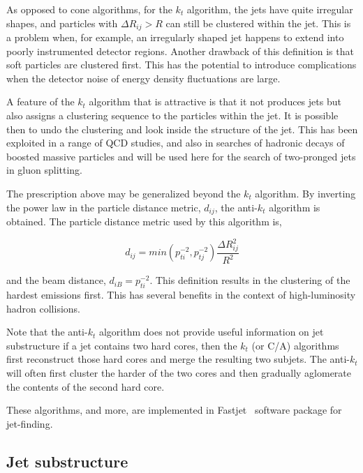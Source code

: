 As opposed to cone algorithms, for the $k_t$ algorithm, the jets have quite irregular shapes, and particles with $\Delta R_{ij} > R$ can still be clustered within the jet. This is a problem when, for example, an irregularly shaped jet happens to extend into poorly instrumented detector regions. Another drawback of this definition is that soft particles are clustered first. This  has the potential to introduce complications when the detector noise of energy density fluctuations are large.

A feature of the $k_t$ algorithm that is attractive is that it not produces jets but also assigns a clustering sequence to the particles within the jet. It is possible then to undo the clustering and look inside the structure of the jet. This has been exploited in a range of QCD studies, and also in searches of hadronic decays of boosted massive particles  and will be used here for the search of two-pronged jets in gluon splitting.

The prescription above may be generalized beyond the $k_t$ algorithm. By inverting the power law in the particle distance metric, $d_{ij}$, the anti-$k_t$ algorithm is obtained. The particle distance metric used by this algorithm is,

\begin{equation} 
d_{ij} = min(p^{-2}_{ti},p^{-2}_{tj}) \frac{\Delta R^2_{ij}}{R^2}
\label{eqn:antikt}
\end{equation}

and the  beam distance, $d_{iB}=p^{-2}_{ti}$. This definition results in the clustering of the hardest emissions first. This has several benefits in the context of high-luminosity hadron collisions.

Note that the anti-$k_t$ algorithm does not provide useful information on jet substructure if a jet contains two hard cores, then the $k_t$ (or C/A) algorithms first reconstruct those hard cores and merge the resulting two subjets. The anti-$k_t$ will often first cluster the harder of the two cores and then gradually aglomerate the contents of the second hard core.

These algorithms, and more, are implemented in {\sc Fastjet}~\cite{fastjet} software package for jet-finding. 


\subsection{Jet substructure}\label{sec:substructure}

